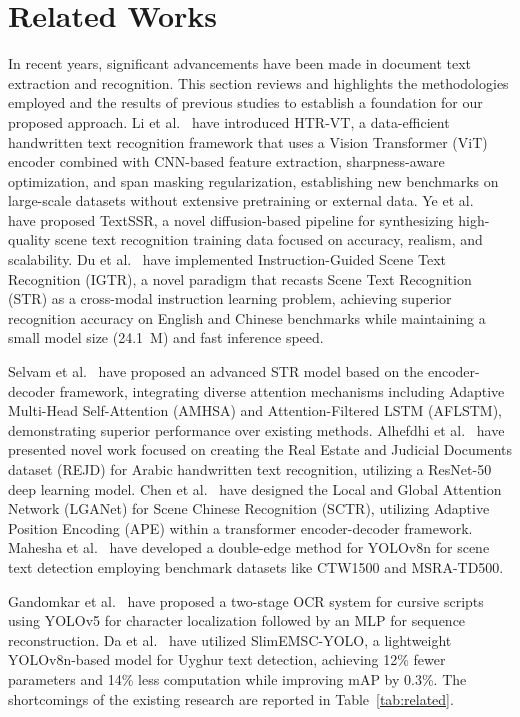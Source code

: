 \documentclass{ieeeaccess}
\begin{document}
\section{Related Works}
\label{sec:related}

In recent years, significant advancements have been made in
document text extraction and recognition. This section reviews and highlights
the methodologies employed and the results of previous studies to establish a
foundation for our proposed approach. Li et al.~\cite{b14} have introduced HTR-VT, a data-efficient handwritten text recognition framework that uses a Vision
Transformer (ViT) encoder combined with CNN-based feature extraction,
sharpness-aware optimization, and span masking regularization, establishing new
benchmarks on large-scale datasets without extensive pretraining or external
data. Ye et al.~\cite{b15} have proposed TextSSR, a novel diffusion-based pipeline
for synthesizing high-quality scene text recognition training data focused on
accuracy, realism, and scalability. Du et al.~\cite{b16} have implemented
Instruction-Guided Scene Text Recognition (IGTR), a novel paradigm that recasts
Scene Text Recognition (STR) as a cross-modal instruction learning problem,
achieving superior recognition accuracy on English and Chinese benchmarks while
maintaining a small model size (24.1~M) and fast inference speed.\par
Selvam et al.~\cite{b17} have proposed an advanced STR model based on the
encoder-decoder framework, integrating diverse attention mechanisms including Adaptive Multi-Head Self-Attention (AMHSA) and Attention-Filtered LSTM (AFLSTM), demonstrating superior performance over existing methods. Alhefdhi et al.~\cite{b18} have presented novel work focused on creating the Real Estate and Judicial Documents dataset (REJD) for Arabic handwritten text recognition, utilizing a ResNet-50 deep learning model. Chen et al.~\cite{b19} have designed the Local and Global Attention Network (LGANet) for Scene Chinese Recognition
(SCTR), utilizing Adaptive Position Encoding (APE) within a transformer
encoder-decoder framework. Mahesha et al.~\cite{b20} have developed a double-edge
method for YOLOv8n for scene text detection employing benchmark datasets like CTW1500 and MSRA-TD500.\par
Gandomkar et al.~\cite{b21} have proposed a two-stage OCR system for cursive scripts using YOLOv5 for character localization followed by an MLP for sequence reconstruction. Da et al.~\cite{b22} have utilized SlimEMSC-YOLO, a lightweight YOLOv8n-based model for Uyghur text detection, achieving 12\% fewer parameters and 14\% less computation while improving mAP by 0.3\%. The shortcomings of the
existing research are reported in Table~\ref{tab:related}.
\end{document}
